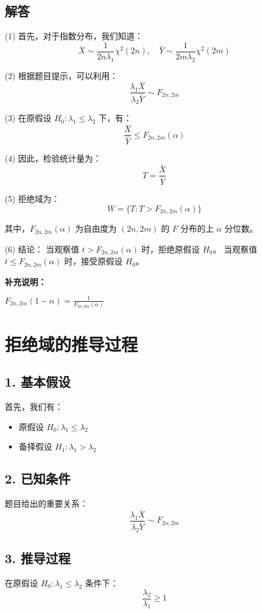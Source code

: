 \documentclass[UTF8]{report}
\theoremstyle{MyLineTheoremStyle} %
\theoremstyle{MyBlockTheoremStyle} %
\theoremstyle{MySubsubsectionStyle} %
\begin{document}
\subsection*{解答}
(1) 首先，对于指数分布，我们知道：
\[ \bar{X} \sim \frac{1}{2n\lambda_1}\chi^2(2n), \quad \bar{Y} \sim \frac{1}{2m\lambda_2}\chi^2(2m) \]

(2) 根据题目提示，可以利用：
\[ \frac{\lambda_1\bar{X}}{\lambda_2\bar{Y}} \sim F_{2n,2m} \]

(3) 在原假设 $H_0:\lambda_1 \leqslant \lambda_2$ 下，有：
\[ \frac{\bar{X}}{\bar{Y}} \leqslant F_{2n,2m}(\alpha) \]

(4) 因此，检验统计量为：
\[ T = \frac{\bar{X}}{\bar{Y}} \]

(5) 拒绝域为：
\[ W = \{T: T > F_{2n,2m}(\alpha)\} \]

其中，$F_{2n,2m}(\alpha)$ 为自由度为 $(2n,2m)$ 的 $F$ 分布的上 $\alpha$ 分位数。

(6) 结论：
当观察值 $t > F_{2n,2m}(\alpha)$ 时，拒绝原假设 $H_0$。
当观察值 $t \leqslant F_{2n,2m}(\alpha)$ 时，接受原假设 $H_0$。

\textbf{补充说明：}

$F_{2n, 2m}(1-\alpha) = \frac{1}{F_{2n, 2m}(\alpha)}$

\section*{拒绝域的推导过程}

\subsection*{1. 基本假设}
首先，我们有：
\begin{itemize}
    \item 原假设 $H_0: \lambda_1 \leqslant \lambda_2$
    \item 备择假设 $H_1: \lambda_1 > \lambda_2$
\end{itemize}

\subsection*{2. 已知条件}
题目给出的重要关系：
\[ \frac{\lambda_1\bar{X}}{\lambda_2\bar{Y}} \sim F_{2n,2m} \]

\subsection*{3. 推导过程}
在原假设 $H_0: \lambda_1 \leqslant \lambda_2$ 条件下：
\[ \frac{\lambda_2}{\lambda_1} \geqslant 1 \]
\end{document}
